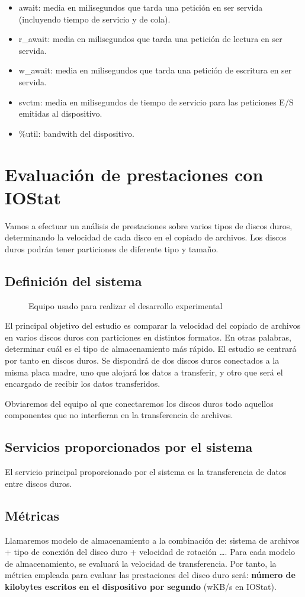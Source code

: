 \documentclass[a4paper,10pt]{article}
\newcommand{\imagent}[5]{
  \begin{figure}
    \begin{center}
    \texttt{[image: \#1]}
    \end{center}
    \caption{#3}
    \label{#4}
  \end{figure}
}
\renewcommand{\texttt}[2][black!60]{\textcolor{#1}{\ttfamily #2}}
\begin{document}
\begin{itemize}
 \item{\texttt{await}}: media en milisegundos que tarda una petición en ser servida (incluyendo tiempo de servicio y de cola).
 \item{\texttt{r\_await}}: media en milisegundos que tarda una petición de lectura en ser servida.
 \item{\texttt{w\_await}}: media en milisegundos que tarda una petición de escritura en ser servida.
 \item{\texttt{svctm}}: media en milisegundos de tiempo de servicio para las peticiones E/S emitidas al dispositivo.
 \item{\texttt{\%util}}: bandwith del dispositivo.
\end{itemize}

\section{Evaluación de prestaciones con IOStat}
Vamos a efectuar un análisis de prestaciones sobre varios tipos de discos duros, determinando la velocidad de cada 
disco en el copiado de archivos. Los discos duros podrán tener particiones de diferente tipo y tamaño.

\subsection{Definición del sistema}
\imagent{system.jpg}{r}{Equipo usado para realizar el desarrollo experimental}{system}{0.6}El principal objetivo del estudio es comparar la velocidad del copiado de archivos en varios discos duros con particiones
en distintos formatos. En otras palabras, determinar cuál es el tipo de almacenamiento más rápido. El estudio se centrará
por tanto en discos duros. Se dispondrá de dos discos duros conectados a la misma placa madre, uno que alojará los datos a
transferir, y otro que será el encargado de recibir los datos transferidos.

Obviaremos del equipo al que conectaremos los discos duros todo aquellos componentes que no interfieran en la transferencia 
de archivos.

\subsection{Servicios proporcionados por el sistema}
El servicio principal proporcionado por el sistema es la transferencia de datos entre discos duros.

\subsection{Métricas}
Llamaremos modelo de almacenamiento a la combinación de: sistema de archivos + tipo de conexión del disco duro + velocidad de rotación \ldots.
Para cada modelo de almacenamiento, se evaluará la velocidad de transferencia. Por tanto, la métrica empleada para evaluar las prestaciones 
del disco duro será: \textbf{número de kilobytes escritos en el dispositivo por segundo} (\texttt{wKB/s} en IOStat).
 
\end{document}
